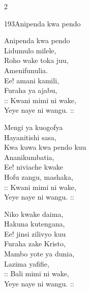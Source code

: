 \begin{multicols}{2}
\begin{hymn}{193}{Anipenda kwa pendo}{}
\begin{stanza}
Anipenda kwa pendo\\
Lidumulo milele,\\
Roho wake toka juu,\\
Amenifunulia.\\
Ee! amani kamili,\\
Furaha ya ajabu,\\
:: Kwani mimi ni wake,\\
Yeye naye ni wangu. ::
\end{stanza}
\begin{stanza}
Mengi ya kuogofya\\
Hayanitishi sasa,\\
Kwa kuwa kwa pendo kuu\\
Ananikumbatia,\\
Ee! niviache kwake\\
Hofu zangu, mashaka,\\
:: Kwani mimi ni wake,\\
Yeye naye ni wangu. ::
\end{stanza}
\begin{stanza}
Niko kwake daima,\\
Hakuna kutengana,\\
Ee! jinsi zilivyo kuu\\
Furaha zake Kristo,\\
Mambo yote ya dunia,\\
Lazima yafifie,\\
:: Bali mimi ni wake,\\
Yeye naye ni wangu. ::
\end{stanza}
\end{hymn}


\end{multicols}
